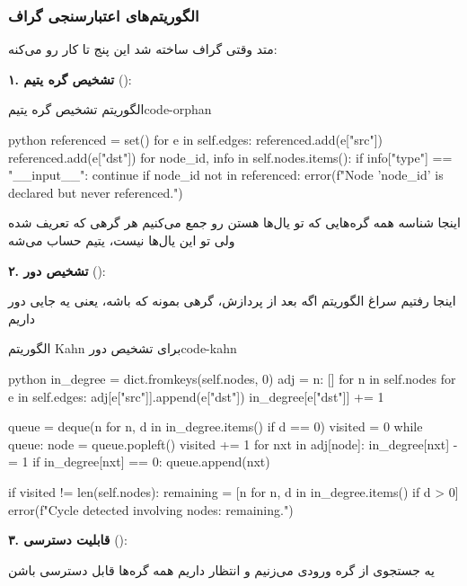 \documentclass{nngraph-fa}
\begin{document}
\subsubsection{الگوریتم‌های اعتبارسنجی گراف}

متد  وقتی گراف ساخته شد این پنج تا کار رو می‌کنه:

\textbf{۱. تشخیص گره یتیم} ():

\begin{codebox}{الگوریتم تشخیص گره یتیم}{code-orphan}
\begin{amzcode}{python}
referenced = set()
for e in self.edges:
    referenced.add(e["src"])
    referenced.add(e["dst"])
for node_id, info in self.nodes.items():
    if info["type"] == "__input__":
        continue
    if node_id not in referenced:
        error(f"Node '{node_id}' is declared but never referenced.")
\end{amzcode}
\end{codebox}

اینجا شناسه همه گره‌هایی که تو یال‌ها هستن رو جمع می‌کنیم
هر گرهی که تعریف شده ولی تو این یال‌ها نیست، یتیم حساب می‌شه

\textbf{۲. تشخیص دور} ():

اینجا رفتیم سراغ الگوریتم 
اگه بعد از پردازش، گرهی بمونه که  باشه، یعنی یه جایی دور داریم

\begin{codebox}{الگوریتم Kahn برای تشخیص دور}{code-kahn}
\begin{amzcode}{python}
in_degree = dict.fromkeys(self.nodes, 0)
adj       = {n: [] for n in self.nodes}
for e in self.edges:
    adj[e["src"]].append(e["dst"])
    in_degree[e["dst"]] += 1

queue   = deque(n for n, d in in_degree.items() if d == 0)
visited = 0
while queue:
    node = queue.popleft()
    visited += 1
    for nxt in adj[node]:
        in_degree[nxt] -= 1
        if in_degree[nxt] == 0:
            queue.append(nxt)

if visited != len(self.nodes):
    remaining = [n for n, d in in_degree.items() if d > 0]
    error(f"Cycle detected involving nodes: {remaining}.")
\end{amzcode}
\end{codebox}

\textbf{۳. قابلیت دسترسی} ():

یه جستجوی  از گره ورودی می‌زنیم و انتظار داریم همه گره‌ها قابل دسترسی باشن
\end{document}

